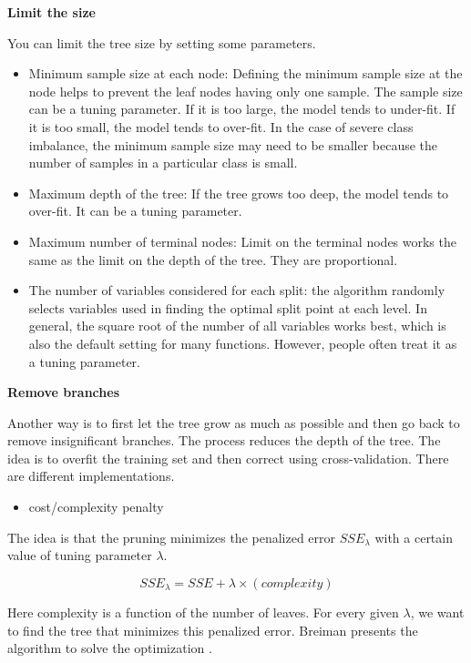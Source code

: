 \documentclass[
  12pt,
]{krantz}
\providecommand{\tightlist}{%
  \setlength{\itemsep}{0pt}\setlength{\parskip}{0pt}}
\begin{document}
\textbf{Limit the size}

You can limit the tree size by setting some parameters.

\begin{itemize}
\item
  Minimum sample size at each node: Defining the minimum sample size at the node helps to prevent the leaf nodes having only one sample. The sample size can be a tuning parameter. If it is too large, the model tends to under-fit. If it is too small, the model tends to over-fit. In the case of severe class imbalance, the minimum sample size may need to be smaller because the number of samples in a particular class is small.
\item
  Maximum depth of the tree: If the tree grows too deep, the model tends to over-fit. It can be a tuning parameter.
\item
  Maximum number of terminal nodes: Limit on the terminal nodes works the same as the limit on the depth of the tree. They are proportional.
\item
  The number of variables considered for each split: the algorithm randomly selects variables used in finding the optimal split point at each level. In general, the square root of the number of all variables works best, which is also the default setting for many functions. However, people often treat it as a tuning parameter.
\end{itemize}

\textbf{Remove branches}

Another way is to first let the tree grow as much as possible and then go back to remove insignificant branches. The process reduces the depth of the tree. The idea is to overfit the training set and then correct using cross-validation. There are different implementations.

\begin{itemize}
\tightlist
\item
  cost/complexity penalty
\end{itemize}

The idea is that the pruning minimizes the penalized error \(SSE_{\lambda}\) with a certain value of tuning parameter \(\lambda\).

\[SSE_{\lambda} = SSE+\lambda \times (complexity)\]

Here complexity is a function of the number of leaves. For every given \(\lambda\), we want to find the tree that minimizes this penalized error. Breiman presents the algorithm to solve the optimization \citep{Breiman1984}.
\end{document}

